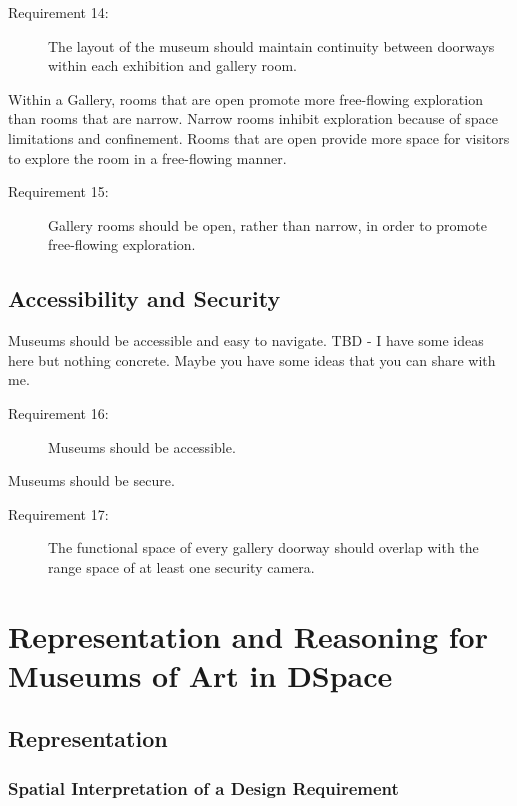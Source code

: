 \documentclass[12pt]{ucthesis}
\begin{document}
\begin{description}
\item[Requirement 14:] The layout of the museum should maintain continuity between doorways within each exhibition and gallery room.
\end{description}

Within a Gallery, rooms that are open promote more free-flowing exploration than rooms that are narrow. Narrow rooms inhibit exploration because of space limitations and confinement. Rooms that are open provide more space for visitors to explore the room in a free-flowing manner.
\begin{description}
\item[Requirement 15:] Gallery rooms should be open, rather than narrow, in order to promote free-flowing exploration.
\end{description}


\subsection{Accessibility and Security}
Museums should be accessible and easy to navigate. TBD - I have some ideas here but nothing concrete. Maybe you have some ideas that you can share with me. 
\begin{description}
\item[Requirement 16:] Museums should be accessible.
\end{description}
Museums should be secure.
\begin{description}
\item[Requirement 17:] The functional space of every gallery doorway should overlap with the range space of at least one security camera.
\end{description}


\section{Representation and Reasoning for Museums of Art in DSpace} 


\subsection{Representation}

\subsubsection{Spatial Interpretation of a Design Requirement}
\end{document}
